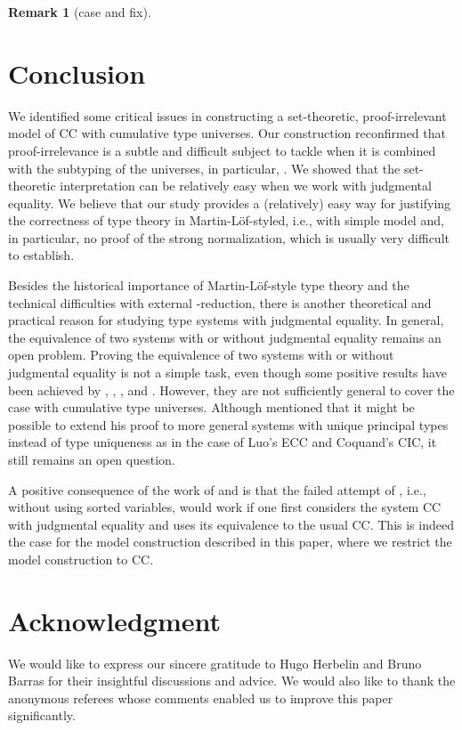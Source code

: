 \documentclass{LMCS}
\theoremstyle{plain}
\theoremstyle{definition}
\newtheorem{remm}[thm]{Remark}
\begin{document}
\begin{remm}[\textsf{case} and \textsf{fix}]
\section{Conclusion}\label{conclusion}
We identified some critical issues in constructing a set-theoretic, proof-irrelevant model of CC with cumulative type universes. Our construction reconfirmed that proof-irrelevance is a subtle and difficult subject to tackle when it is combined with the subtyping of the universes, in particular, . We showed that the set-theoretic interpretation can be relatively easy when we work with judgmental equality. We believe that our study provides a (relatively) easy way for justifying the correctness of type theory in Martin-L\"of-styled, i.e., with simple model and, in particular, no proof of the strong normalization, which is usually very difficult to establish.

Besides the historical importance of Martin-L\"of-style type theory and the technical difficulties with external -reduction, there is another theoretical and practical reason for studying type systems with judgmental equality. In general, the equivalence of two systems with or without judgmental equality remains an open problem. Proving the equivalence of two systems with or without judgmental equality is not a simple task, even though some positive results have been achieved by \cite{coquand-algo}, \cite{goguen-phd, goguen-sound}, \cite{adams-eq}, and \cite{siles}. However, they are not sufficiently general to cover the case with cumulative type universes. Although \cite{adams-eq} mentioned that it might be possible to extend his proof to more general systems with unique principal types instead of type uniqueness as in the case of Luo's ECC \citep{luo-ecc, luo-utt} and Coquand's CIC, it still remains an open question.

A positive consequence of the work of \cite{adams-eq} and \cite{siles} is that the failed attempt of \cite{miwe}, i.e., without using sorted variables, would work if one first considers the system CC with judgmental equality and uses its equivalence to the usual CC. This is indeed the case for the model construction described in this paper, where we restrict the model construction to CC.


\section*{Acknowledgment}
We would like to express our sincere gratitude to Hugo Herbelin and Bruno Barras for their insightful discussions and advice. We would also like to thank the anonymous referees whose comments enabled us to improve this paper significantly.






\end{remm}
\end{document}

